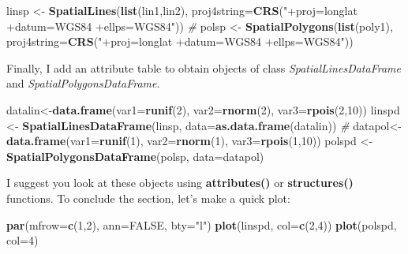 \documentclass[]{report}
\newenvironment{Shaded}{\begin{snugshade}}{\end{snugshade}}
\newcommand{\CommentTok}[1]{\textcolor[rgb]{0.56,0.35,0.01}{\textit{#1}}}
\newcommand{\DataTypeTok}[1]{\textcolor[rgb]{0.13,0.29,0.53}{#1}}
\newcommand{\DecValTok}[1]{\textcolor[rgb]{0.00,0.00,0.81}{#1}}
\newcommand{\KeywordTok}[1]{\textcolor[rgb]{0.13,0.29,0.53}{\textbf{#1}}}
\newcommand{\NormalTok}[1]{#1}
\newcommand{\OtherTok}[1]{\textcolor[rgb]{0.56,0.35,0.01}{#1}}
\newcommand{\StringTok}[1]{\textcolor[rgb]{0.31,0.60,0.02}{#1}}
\begin{document}
\begin{Shaded}
\begin{Highlighting}[]
\NormalTok{linsp <-}\StringTok{ }\KeywordTok{SpatialLines}\NormalTok{(}\KeywordTok{list}\NormalTok{(lin1,lin2),}
    \DataTypeTok{proj4string=}\KeywordTok{CRS}\NormalTok{(}\StringTok{"+proj=longlat +datum=WGS84 +ellps=WGS84"}\NormalTok{))}
\CommentTok{#}
\NormalTok{polsp <-}\StringTok{ }\KeywordTok{SpatialPolygons}\NormalTok{(}\KeywordTok{list}\NormalTok{(poly1),}
    \DataTypeTok{proj4string=}\KeywordTok{CRS}\NormalTok{(}\StringTok{"+proj=longlat +datum=WGS84 +ellps=WGS84"}\NormalTok{))}
\end{Highlighting}
\end{Shaded}

Finally, I add an attribute table to obtain objects of class
\emph{SpatialLinesDataFrame} and \emph{SpatialPolygonsDataFrame}.

\begin{Shaded}
\begin{Highlighting}[]
\NormalTok{datalin<-}\KeywordTok{data.frame}\NormalTok{(}\DataTypeTok{var1=}\KeywordTok{runif}\NormalTok{(}\DecValTok{2}\NormalTok{), }\DataTypeTok{var2=}\KeywordTok{rnorm}\NormalTok{(}\DecValTok{2}\NormalTok{), }\DataTypeTok{var3=}\KeywordTok{rpois}\NormalTok{(}\DecValTok{2}\NormalTok{,}\DecValTok{10}\NormalTok{))}
\NormalTok{linspd <-}\StringTok{ }\KeywordTok{SpatialLinesDataFrame}\NormalTok{(linsp, }\DataTypeTok{data=}\KeywordTok{as.data.frame}\NormalTok{(datalin))}
\CommentTok{#}
\NormalTok{datapol<-}\KeywordTok{data.frame}\NormalTok{(}\DataTypeTok{var1=}\KeywordTok{runif}\NormalTok{(}\DecValTok{1}\NormalTok{), }\DataTypeTok{var2=}\KeywordTok{rnorm}\NormalTok{(}\DecValTok{1}\NormalTok{), }\DataTypeTok{var3=}\KeywordTok{rpois}\NormalTok{(}\DecValTok{1}\NormalTok{,}\DecValTok{10}\NormalTok{))}
\NormalTok{polspd <-}\StringTok{ }\KeywordTok{SpatialPolygonsDataFrame}\NormalTok{(polsp, }\DataTypeTok{data=}\NormalTok{datapol)}
\end{Highlighting}
\end{Shaded}

I suggest you look at these objects using \textbf{attributes()} or
\textbf{structures()} functions. To conclude the section, let's make a
quick plot:

\begin{Shaded}
\begin{Highlighting}[]
\KeywordTok{par}\NormalTok{(}\DataTypeTok{mfrow=}\KeywordTok{c}\NormalTok{(}\DecValTok{1}\NormalTok{,}\DecValTok{2}\NormalTok{), }\DataTypeTok{ann=}\OtherTok{FALSE}\NormalTok{, }\DataTypeTok{bty=}\StringTok{"l"}\NormalTok{)}
\KeywordTok{plot}\NormalTok{(linspd, }\DataTypeTok{col=}\KeywordTok{c}\NormalTok{(}\DecValTok{2}\NormalTok{,}\DecValTok{4}\NormalTok{))}
\KeywordTok{plot}\NormalTok{(polspd, }\DataTypeTok{col=}\DecValTok{4}\NormalTok{)}
\end{Highlighting}
\end{Shaded}
\end{document}

